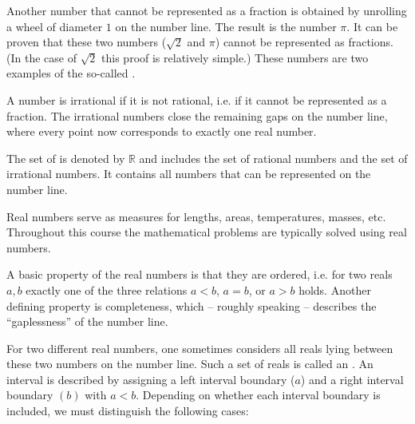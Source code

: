 \begin{MIntro}
\vspace*{5mm}

Another number that cannot be represented as a fraction is obtained by unrolling a wheel of diameter $1$ 
on the number line. The result is the number $\pi$. It can be proven that these two numbers ($\sqrt{2}$ and $\pi$)
cannot be represented as fractions. (In the case of $\sqrt{2}$ this proof is relatively simple.) These numbers are two 
examples of the so-called .

\vspace*{5mm}

\begin{center}
\end{center}

A number is irrational if it is not rational, i.e. if it cannot be represented as a fraction.
The irrational numbers close the remaining gaps on the number line, where every point now
corresponds to exactly one real number. 

\begin{MInfo}
The set of  is denoted by $\mathbb{R}$ and includes the set of rational 
numbers and the set of irrational numbers. It contains all numbers that can be represented on the number line.
\end{MInfo}

Real numbers serve as measures for lengths, areas, temperatures, masses, etc. Throughout this course 
the mathematical problems are typically solved using real numbers.

A basic property of the real numbers is that they are ordered, i.e. for two reals $a,b$ exactly one of
the three relations $a<b$, $a=b$, or $a>b$ holds. Another defining property is completeness, which -- 
roughly speaking -- describes the ``gaplessness'' of the number line.

\begin{MInfo}
For two different real numbers, one sometimes considers all reals lying between these two 
numbers on the number line. Such a set of reals is called an .
An interval is described by assigning a left interval boundary ($a$) and a right 
interval boundary $(b)$ with $a<b$. Depending on whether each interval boundary is included, we must distinguish the following cases:



\end{MInfo}
\end{MIntro}
